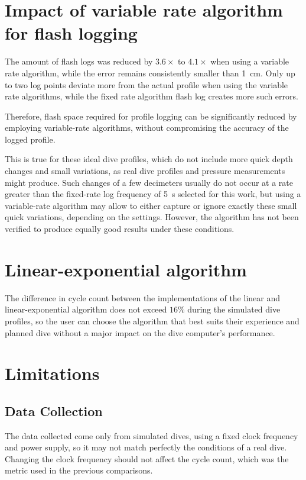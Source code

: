 \section{Impact of variable rate algorithm for flash logging}
The amount of flash logs was reduced by $3.6\times$ to $4.1\times$ when using a variable rate algorithm, while the error remains consistently smaller than \SI{1}{\centi\meter}. Only up to two log points deviate more from the actual profile when using the variable rate algorithms, while the fixed rate algorithm flash log creates more such errors.

Therefore, flash space required for profile logging can be significantly reduced by employing variable-rate algorithms, without compromising the accuracy of the logged profile.

This is true for these ideal dive profiles, which do not include more quick depth changes and small variations, as real dive profiles and pressure measurements might produce. 
Such changes of a few decimeters usually do not occur at a rate greater than the fixed-rate log frequency of \SI{5}{\second} selected for this work, but using a variable-rate algorithm may allow to either capture or ignore exactly these small quick variations, depending on the settings.
However, the algorithm has not been verified to produce equally good results under these conditions.

\section{Linear-exponential algorithm}
The difference in cycle count between the implementations of the linear and linear-exponential algorithm does not exceed $16\%$ during the simulated dive profiles, so the user can choose the algorithm that best suits their experience and planned dive without a major impact on the dive computer's performance.

\section{Limitations}
\subsection{Data Collection}
The data collected come only from simulated dives, using a fixed clock frequency and power supply, so it may not match perfectly the conditions of a real dive. 
Changing the clock frequency should not affect the cycle count, which was the metric used in the previous comparisons.

